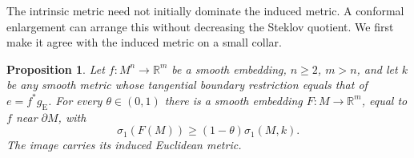 \documentclass[11pt]{article}
\newtheorem{proposition}[proposition]{Proposition}
\theoremstyle{remark}
\newcommand{\R}{\mathbb R}
\begin{document}
The intrinsic metric need not initially dominate the induced metric.
A conformal enlargement can arrange this without decreasing the
Steklov quotient. We first make it agree with the induced metric on a
small collar.

\begin{proposition}\label{prop:transfer}
Let $f:M^n\to\R^m$ be a smooth embedding, $n\geq2$, $m>n$, and
let $k$ be any smooth metric whose tangential boundary restriction
equals that of $e=f^*g_{\mathrm E}$. For every $\theta\in(0,1)$ there is
a smooth embedding $F:M\to\R^m$, equal to $f$ near $\partial M$, with
\begin{equation}\label{eq:transfer}
 \sigma_1(F(M))\geq(1-\theta)\sigma_1(M,k).
\end{equation}
The image carries its induced Euclidean metric.
\end{proposition}
\end{document}
